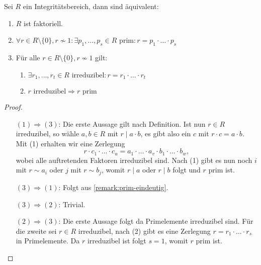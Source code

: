 \begin{proposition} \label{prop:faktorielle-equiv}
    Sei $R$ ein Integritätsbereich, dann sind äquivalent:
    \begin{enumerate}
        \item $R$ ist faktoriell.
        \item $ \forall r \in R \setminus \{0\}, r \not\sim 1: \exists p_1, \hdots, p_s \in R \text{ prim}: r = p_1 \cdot \hdots \cdot p_s $
        \item Für alle $ r \in R \setminus \{0\}, r \not\sim 1 $ gilt:
        \begin{enumerate}[label=\roman*.]
            \item $ \exists r_1, \hdots, r_t \in R \text{ irreduzibel}: r = r_1 \cdot \hdots \cdot r_t $
            \item $ r \text{ irreduzibel} \Rightarrow r \text{ prim} $
        \end{enumerate}
    \end{enumerate}
\end{proposition}


\begin{proof}{\ }
    \begin{itemize}[leftmargin=2.5cm]
        \item[$(1) \Rightarrow (3)$:] Die erste Aussage gilt nach Definition. Ist nun $r \in R$ irreduzibel, so wähle $a, b \in R$ mit $r \mid a \cdot b$, es gibt also ein $c$ mit $r \cdot c = a \cdot b$. Mit (1) erhalten wir eine Zerlegung $$ r \cdot c_1 \cdot \hdots \cdot c_u = a_1 \cdot \hdots \cdot a_v \cdot b_1 \cdot \hdots \cdot b_w, $$ wobei alle auftretenden Faktoren irreduzibel sind. Nach (1) gibt es nun noch $i$ mit $r \sim a_i$ oder $j$ mit  $r \sim b_j$, womit $r \mid a$ oder $r \mid b$ folgt und $r$ prim ist.

        \item[$(3) \Rightarrow (1)$:] Folgt aus \cref{remark:prim-eindeutig}.
        
        \item[$(3) \Rightarrow (2)$:] Trivial.

        \item[$(2) \Rightarrow (3)$:] Die erste Aussage folgt da Primelemente irreduzibel sind. Für die zweite sei $r \in R$ irreduzibel, nach (2) gibt es eine Zerlegung $r = r_1 \cdot \hdots \cdot r_s$ in Primelemente. Da $r$ irreduzibel ist folgt $s = 1$, womit $r$ prim ist.
    \end{itemize}
\end{proof}

